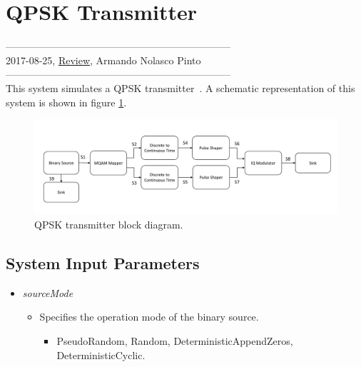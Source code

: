 \section{QPSK Transmitter}

\begin{refsection}

--------------------------------------------------------------------\\
2017-08-25, \underline{Review}, Armando Nolasco Pinto\\
--------------------------------------------------------------------\\

This system simulates a QPSK transmitter~\cite{loudon2000}. A schematic representation of this system is shown in figure \ref{QPSK_transmitter_block_diagram_simple}.

\begin{figure}[h]
	\centering
	\includegraphics[width=1.0\textwidth]{./sdf/qpsk_transmitter/figures/qpsk_transmitter.pdf}
	\caption{QPSK transmitter block diagram.}\label{QPSK_transmitter_block_diagram_simple}
\end{figure}

\subsection*{System Input Parameters}
\hspace{10mm}
\renewcommand{\labelitemi}{\textbf{Parameter: }}
\renewcommand\labelitemii{\textbf{Description: }}
\renewcommand\labelitemiii{\textbf{Accepted Values: }}
 \begin{itemize}

   \item  \emph{sourceMode}
   \begin{itemize}
     \item  Specifies the operation mode of the binary source.
     \begin{itemize}
       \item  PseudoRandom, Random, DeterministicAppendZeros, DeterministicCyclic.
     \end{itemize}
   \end{itemize}


\end{itemize}
\end{refsection}
